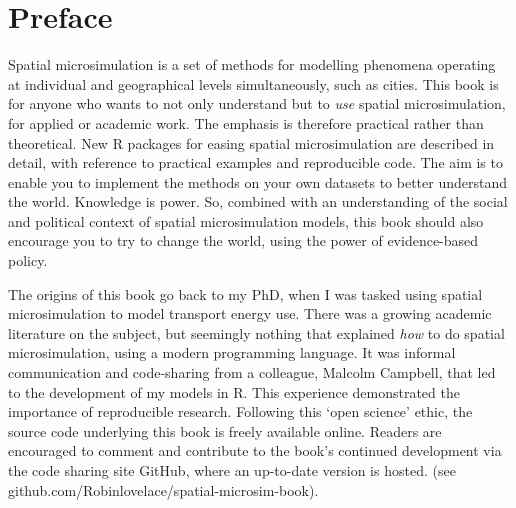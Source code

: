 \chapter*{Preface}

Spatial microsimulation is a set of methods for modelling phenomena operating
at individual and geographical levels simultaneously, such as cities.
This book is for anyone who wants to not only understand
but to \emph{use} spatial microsimulation, for applied or academic work.
The emphasis is therefore practical rather than theoretical.
New R packages for easing spatial microsimulation are described in
detail, with reference to practical examples and reproducible code.
The aim is to enable you to implement the methods on your own
datasets to better understand the world. 
Knowledge is power. So, combined with an understanding of the social and
political context of spatial microsimulation models, this book should
also encourage you to try to change the world, using the power of
evidence-based policy.


The origins of this book go back to my PhD, when
I was tasked using spatial microsimulation to model transport energy use.
There was a growing academic literature on the subject,
but seemingly nothing that explained \emph{how} to do spatial microsimulation,
using a modern programming language.
It was informal communication and code-sharing from a colleague,
Malcolm Campbell, that led to the development of my models in R.
This experience demonstrated the importance of
reproducible research. Following this `open science' ethic,
the source code underlying this book is freely
available online. Readers are encouraged to comment and contribute to
the book's continued development via the code sharing site GitHub, where
an up-to-date version is hosted.
(see github.com/Robinlovelace/spatial-microsim-book).

